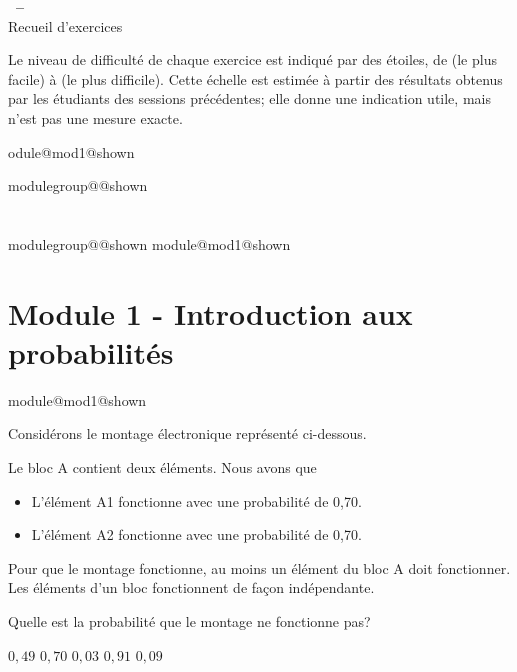 \documentclass{Evaluation}
\makeatletter
\newcommand{\currentmodulekey}{}
\newcommand{\currentmoduletitle}{}
\newcommand{\currentgroupkey}{}
\newcommand{\currentgrouptitle}{}
\newcommand{\moduleheader}[2]{%
  \renewcommand{\currentmodulekey}{#1}%
  \renewcommand{\currentmoduletitle}{#2}%
  \expandafter\global\expandafter\let\csname module@#1@shown\endcsname\relax
}
\newcommand{\showmoduleifneeded}{%
  \ifx\currentgroupkey\empty\else
    \expandafter\ifx\csname modulegroup@\currentgroupkey @shown\endcsname\relax
      \section*{\currentgrouptitle}%
      \expandafter\gdef\csname modulegroup@\currentgroupkey @shown\endcsname{1}%
    \fi
  \fi
  \expandafter\ifx\csname module@\currentmodulekey @shown\endcsname\relax
    \section*{\currentmoduletitle}%
    \expandafter\gdef\csname module@\currentmodulekey @shown\endcsname{1}%
  \fi
}
\newenvironment{A22}{\showmoduleifneeded}{}
\makeatother
\begin{document}
\begin{center}
  {\Large\textbf{\SigleNumero\ -- \NomCours}}\\[0.3cm]
  {\large Recueil d'exercices}
\end{center}
\medskip

\noindent\small Le niveau de difficulté de chaque exercice est indiqué par des étoiles, de  (le plus facile) à  (le plus difficile). Cette échelle est estimée à partir des résultats obtenus par les étudiants des sessions précédentes; elle donne une indication utile, mais n'est pas une mesure exacte.
\normalsize
\medskip

\begin{questions}


\moduleheader{mod1}{Module 1 - Introduction aux probabilités}

\begin{A22}
\question {} %
Considérons le montage électronique représenté ci-dessous. 
	
	\begin{figure}[h!]
		\label{A22-I1-fig:montage}
		\begin{center}	 \end{center}
		\end{figure}
	Le bloc A contient deux éléments. Nous avons que
	\begin{itemize}
		\item L'élément A1 fonctionne avec une probabilité de 0,70.
		\item L'élément A2 fonctionne avec une probabilité de 0,70.
	\end{itemize}
	Pour que le montage fonctionne, au moins un élément du bloc A doit fonctionner. Les éléments d'un bloc fonctionnent de façon indépendante.
	
	
	

Quelle est la probabilité que le montage ne fonctionne pas? 

\begin{oneparcheckboxes}
\choice $0,49$
\choice $0,70$
\choice $0,03$
\choice $0,91$
\CorrectChoice $0,09$
\end{oneparcheckboxes}


\end{A22}
\end{questions}
\end{document}
